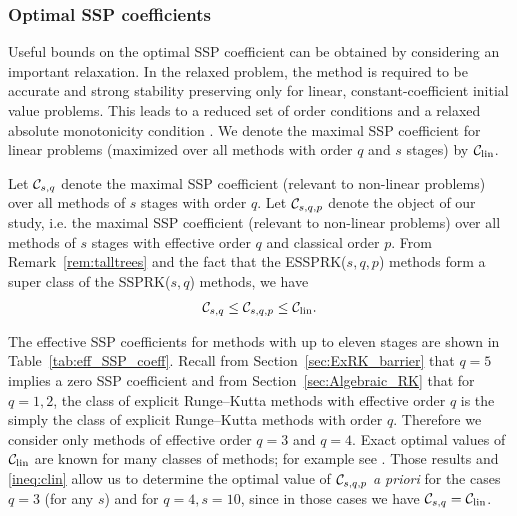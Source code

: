 \subsubsection{Optimal SSP coefficients}\label{subsubsec:optimal_SSP_coeff}
Useful bounds on the optimal SSP coefficient can be obtained 
by considering an important relaxation. 
In the relaxed problem, the method is required to be accurate and strong 
stability preserving only for linear, constant-coefficient initial value problems. 
This leads to a reduced set of order conditions and a relaxed absolute 
monotonicity condition \cite{Kraaijevanger1986,Ketcheson2008,ketcheson2009a}.
We denote the maximal SSP coefficient for linear problems
(maximized over all methods with order $q$ and $s$ stages) by $\mathcal{C}_{\text{lin}}$.

Let $\mathcal{C}_{s,q}$ denote the maximal SSP coefficient (relevant to
non-linear problems) over all methods of $s$ stages with order $q$.  Let
$\mathcal{C}_{s,q,p}$ denote the object of our study, i.e. the maximal SSP
coefficient (relevant to non-linear problems) over all methods of $s$ stages
with effective order $q$ and classical order $p$.
From Remark~\ref{rem:talltrees} and the fact that the ESSPRK($s,q,p$) methods
form a super class of the SSPRK($s,q$) methods, we have
\begin{align} \label{ineq:clin}
        \mathcal{C}_{s,q} \le \mathcal{C}_{s,q,p} \le\mathcal{C}_{\text{lin}}.
\end{align}

The effective SSP coefficients for methods with up to eleven stages are shown in 
Table~\ref{tab:eff_SSP_coeff}.
Recall from Section~\ref{sec:ExRK_barrier} that $q=5$ implies a zero
SSP coefficient and from Section~\ref{sec:Algebraic_RK} that for
$q=1,2$, the class of explicit Runge--Kutta methods with effective order $q$
is the simply the class of explicit Runge--Kutta methods with order $q$.  %
Therefore we consider only methods of effective order $q=3$ and $q=4$.
Exact optimal values of $\mathcal{C}_{\text{lin}}$ are known for many classes of methods; for
example see \cite{Kraaijevanger1986,Ketcheson2008,ketcheson2009a}.
Those results and \eqref{ineq:clin} allow us to determine the optimal value
of $\mathcal{C}_{s,q,p}$ {\em a priori} for the cases $q=3$ (for any $s$) and
for $q=4,s=10$, since in those cases we have $\mathcal{C}_{s,q}=\mathcal{C}_{\text{lin}}$.

